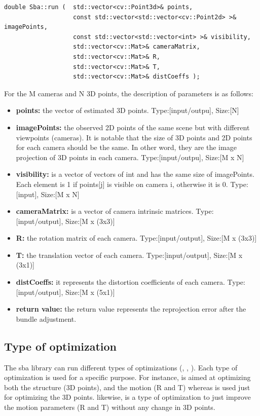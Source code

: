 \begin{lstlisting}
double Sba::run (  std::vector<cv::Point3d>& points,
                   const std::vector<std::vector<cv::Point2d> >& imagePoints,
                   const std::vector<std::vector<int> >& visibility,
                   std::vector<cv::Mat>& cameraMatrix,
                   std::vector<cv::Mat>& R,
                   std::vector<cv::Mat>& T,
                   std::vector<cv::Mat>& distCoeffs );

\end{lstlisting} \label{lst:cvsba}
For the M cameras and N 3D points, the description of parameters is as follows:
\begin{itemize}
\item \textbf{points:} the vector of estimated 3D points. Type:[input/outpu], Size:[N]
\item \textbf{imagePoints:} the observed 2D points of the same scene but with different viewpoints (cameras). It is notable that the size of 3D points and 2D points for each camera should be the same. In other word, they are the image projection of 3D points in each camera. Type:[input/outpu], Size:[M x N]
\item \textbf{visibility:} is a vector of vectors of int and has the same size of imagePoints. Each element is 1 if points[j] is visible on camera i, otherwise it is 0. Type:[input], Size:[M x N] 
\item \textbf{cameraMatrix:} is a vector of camera intrinsic matrices. Type:[input/output], Size:[M x (3x3)]
\item \textbf{R:} the rotation matrix of each camera. Type:[input/output], Size:[M x (3x3)]
\item \textbf{T:} the translation vector of each camera. Type:[input/output], Size:[M x (3x1)]
\item \textbf{distCoeffs:} it represents the distortion coefficients of each camera. Type:[input/output], Size:[M x (5x1)]
\item \textbf{return value:} the return value represents the reprojection error after the bundle adjustment.
\end{itemize}

\subsection{Type of optimization} \label{subsec:type_of_optimization}
The sba library can run different types of optimizations (, , ). Each type of optimization is used for a specific purpose. For instance,  is aimed at optimizing both the structure (3D points), and the motion (R and T) whereas  is used just for optimizing the 3D points. likewise,  is a type of optimization to just improve the motion parameters (R and T) without any change in 3D points.

